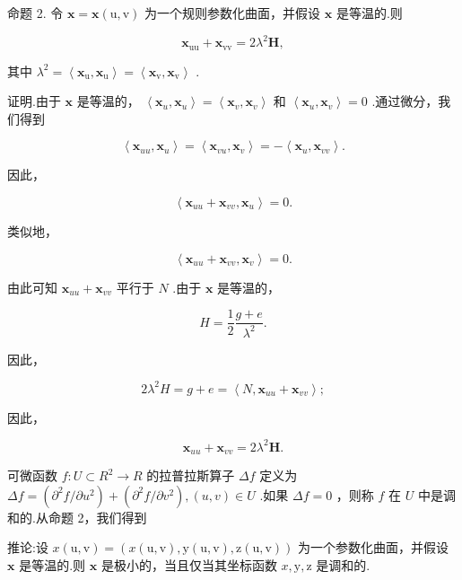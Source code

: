 命题 2. 令 \(\mathbf{x} = \mathbf{x}\left( {\mathrm{u},\mathrm{v}}\right)\) 为一个规则参数化曲面，并假设 \(\mathbf{x}\) 是等温的.则

\[
{\mathbf{x}}_{\mathrm{{uu}}} + {\mathbf{x}}_{\mathrm{{vv}}} = 2{\lambda }^{2}\mathbf{H},
\]

其中 \({\lambda }^{2} = \left\langle  {{\mathbf{x}}_{\mathrm{u}},{\mathbf{x}}_{\mathrm{u}}}\right\rangle   = \left\langle  {{\mathbf{x}}_{\mathrm{v}},{\mathbf{x}}_{\mathrm{v}}}\right\rangle\) .

证明.由于 \(\mathbf{x}\) 是等温的， \(\left\langle  {{\mathbf{x}}_{u},{\mathbf{x}}_{u}}\right\rangle   = \left\langle  {{\mathbf{x}}_{v},{\mathbf{x}}_{v}}\right\rangle\) 和 \(\left\langle  {{\mathbf{x}}_{u},{\mathbf{x}}_{v}}\right\rangle   = 0\) .通过微分，我们得到

\[
\left\langle  {{\mathbf{x}}_{uu},{\mathbf{x}}_{u}}\right\rangle   = \left\langle  {{\mathbf{x}}_{vu},{\mathbf{x}}_{v}}\right\rangle   =  - \left\langle  {{\mathbf{x}}_{u},{\mathbf{x}}_{vv}}\right\rangle  .
\]

因此，

\[
\left\langle  {{\mathbf{x}}_{uu} + {\mathbf{x}}_{vv},{\mathbf{x}}_{u}}\right\rangle   = 0.
\]

类似地，

\[
\left\langle  {{\mathbf{x}}_{uu} + {\mathbf{x}}_{vv},{\mathbf{x}}_{v}}\right\rangle   = 0.
\]

由此可知 \({\mathbf{x}}_{uu} + {\mathbf{x}}_{vv}\) 平行于 \(N\) .由于 \(\mathbf{x}\) 是等温的，

\[
H = \frac{1}{2}\frac{g + e}{{\lambda }^{2}}.
\]

因此，

\[
2{\lambda }^{2}H = g + e = \left\langle  {N,{\mathbf{x}}_{uu} + {\mathbf{x}}_{vv}}\right\rangle  ;
\]

因此，

\[
{\mathbf{x}}_{uu} + {\mathbf{x}}_{vv} = 2{\lambda }^{2}\mathbf{H}. \tag{Q.E.D.}
\]

可微函数 \(f : U \subset  {R}^{2} \rightarrow  R\) 的拉普拉斯算子 \({\Delta f}\) 定义为 \({\Delta f} = \left( {{\partial }^{2}f/\partial {u}^{2}}\right)  + \left( {{\partial }^{2}f/\partial {v}^{2}}\right) ,\left( {u,v}\right)  \in  U\) .如果 \({\Delta f} = 0\) ，则称 \(f\) 在 \(U\) 中是调和的.从命题 2，我们得到

推论:设 \(x\left( {\mathrm{u},\mathrm{v}}\right)  = \left( {x\left( {\mathrm{u},\mathrm{v}}\right) ,\mathrm{y}\left( {\mathrm{u},\mathrm{v}}\right) ,\mathrm{z}\left( {\mathrm{u},\mathrm{v}}\right) }\right)\) 为一个参数化曲面，并假设 \(\mathbf{x}\) 是等温的.则 \(\mathbf{x}\) 是极小的，当且仅当其坐标函数 \(x,\mathrm{y},\mathrm{z}\) 是调和的.

